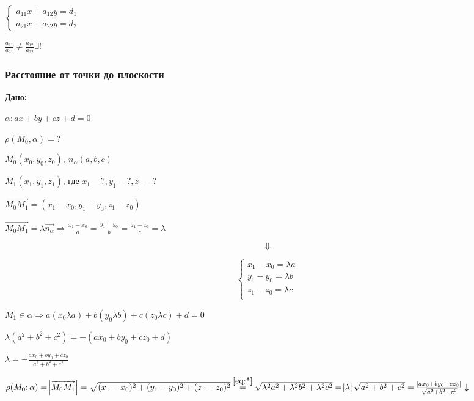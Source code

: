 \documentclass{article}
\begin{document}
    \( \begin{cases}
        a_{11}x + a_{12}y = d_1\\
        a_{21}x + a_{22}y = d_2
    \end{cases} \)
    
    \( \frac{a_{11}}{a_{21}} \neq \frac{a_{12}}{a_{22}} \exists! \)

    \subsubsection{Расстояние от точки до плоскости}

    \textbf{Дано:} 
    
    \( \alpha: ax + by + cz + d = 0 \)
    
    \( \rho (M_0, \alpha) = ?\)

    \(M_0(x_0, y_0, z_0),\ n_\alpha(a, b, c)\)

    \( M_1 (x_1, y_1, z_1) \), где \( x_1 - ?, y_1 - ?, z_1 - ? \)
    
    \( \overrightarrow{M_0M_1} = (x_1 - x_0, y_1 - y_0, z_1 - z_0) \)

    \( \overrightarrow{M_0M_1} = \lambda\overrightarrow{n_\alpha} \Rightarrow \frac{x_1 - x_0}{a} = \frac{y_1 - y_0}{b} = \frac{z_1 - z_0}{c} = \lambda \)
    
    \[\Downarrow\]
    
    \begin{equation}\label{eq:*}
        \begin{cases}
            x_1 - x_0 = \lambda a\\
            y_1 - y_0 = \lambda b\\
            z_1 - z_0 = \lambda c\\
        \end{cases}
    \end{equation}

    \( M_1 \in \alpha \Rightarrow a(x_0 \lambda a) + b(y_0 \lambda b) + c(z_0 \lambda c) + d = 0 \)

    \( \lambda (a^2 + b^2 + c^2) = -(ax_0 + by_0 + cz_0 + d) \)
    
    \(\lambda = -\frac{ax_0 + by_0 + cz_0}{a^2 + b^2 + c^2}\)

    \( \rho(M_0; \alpha) = \abs{\overrightarrow{M_0M_1}} = \sqrt{(x_1 - x_0)^2 + (y_1 - y_0)^2 + (z_1 - z_0)^2} \stackrel{\ref{eq:*}}{=} \sqrt{\lambda^2a^2 + \lambda^2b^2 + \lambda^2c^2} = \abs{\lambda}\sqrt{a^2+b^2+c^2} = \frac{\abs{ax_0 + by_0 + cz_0}}{\sqrt{a^2 + b^2 + c^2}} \downarrow\)
\end{document}
